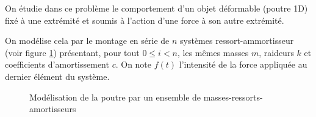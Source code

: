 
On étudie dans ce problème le comportement d'un objet déformable (poutre 1D) fixé à une extrémité et soumis à l'action d'une force à son autre extrémité. 

On modélise cela par le montage en série de $n$ systèmes ressort-ammortisseur (voir figure \ref{fig1}) présentant, pour tout $0 \leq i < n$, 
les mêmes masses  $m$, raideurs $k$ et coefficients d'amortissement $c$.
On note $f(t)$ l'intensité de la force appliquée au dernier élément du système. 


\begin{figure}[!htb]
\begin{center}

\end{center}
\caption{Modélisation de la poutre par un ensemble de masses-ressorts-amortisseurs\label{fig1}}
\end{figure}



